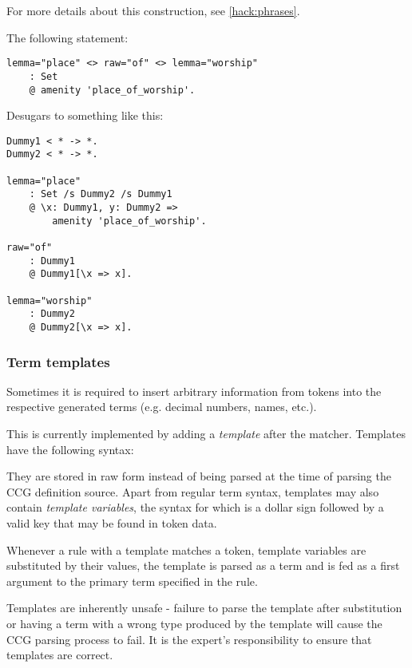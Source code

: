 \documentclass[main.tex]{subfiles}
\begin{document}
For more details about this construction, see \cref{hack:phrases}.

\begin{example}
The following statement:
\begin{lstlisting}
lemma="place" <> raw="of" <> lemma="worship"
    : Set
    @ amenity 'place_of_worship'.
\end{lstlisting}

Desugars to something like this:
\begin{lstlisting}
Dummy1 < * -> *.
Dummy2 < * -> *.

lemma="place"
    : Set /s Dummy2 /s Dummy1
    @ \x: Dummy1, y: Dummy2 =>
        amenity 'place_of_worship'.

raw="of"
    : Dummy1
    @ Dummy1[\x => x].

lemma="worship"
    : Dummy2
    @ Dummy2[\x => x].
\end{lstlisting}
\end{example}

\subsubsection{Term templates}
Sometimes it is required to insert arbitrary information from tokens into
the respective generated terms (e.g. decimal numbers, names, etc.).

This is currently implemented by adding a \emph{template} after the
matcher. Templates have the following syntax:
\begin{center}
\end{center}

They are stored in raw form instead of being
parsed at the time of parsing the
CCG definition source. Apart from regular term syntax, templates may also
contain \emph{template variables}, the syntax for which is a dollar sign
followed by a valid key that may be found in token data.

Whenever a rule with a template matches a token, template variables are
substituted by their values, the template is parsed as a term and is fed
as a first argument to the primary term specified in the rule.

Templates are inherently unsafe - failure to parse the template after substitution
or having a term with a wrong type produced by the template will cause the
CCG parsing process to fail. It is the expert's responsibility to ensure that
templates are correct.
\end{document}
